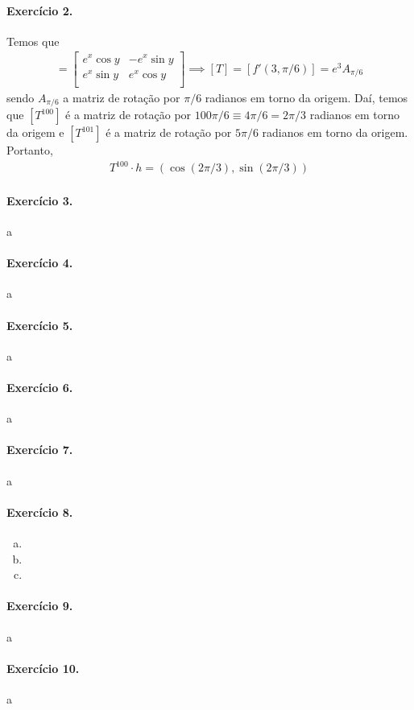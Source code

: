 \documentclass[12pt,a4paper]{article}
\begin{document}
\paragraph{Exercício 2.}
    Temos que
    \begin{align*}
        [f'(x,y)] = 
        \begin{bmatrix}
            e^x\cos y & -e^x\sin y \\
            e^x\sin y & e^x\cos y \\
        \end{bmatrix} 
        \implies
        [T] = [f'(3, \pi/6)] = 
        e^3A_{\pi/6}
    \end{align*}
    sendo $A_{\pi/6}$ a matriz de rotação por $\pi/6$ radianos em torno da origem. Daí, temos que $[T^{100}]$
    é a matriz de rotação por $100\pi/6 \equiv 4\pi/6 = 2\pi/3$ radianos em torno da origem e $[T^{101}]$ é
    a matriz de rotação por $5\pi/6$ radianos em torno da origem. Portanto,
    \begin{align*}
        T^{100}\cdot h = (\cos(2\pi/3), \sin(2\pi/3))
    \end{align*}
%
\paragraph{Exercício 3.}
    a
%
\paragraph{Exercício 4.}
    a
%
\paragraph{Exercício 5.}
    a
%
\paragraph{Exercício 6.}
    a
%
\paragraph{Exercício 7.}
    a
%
\paragraph{Exercício 8.}
%
    \begin{enumerate}[a)]
        \item 
        \item
        \item 
    \end{enumerate}
%
\paragraph{Exercício 9.}
    a
%
\paragraph{Exercício 10.}
    a
%
\end{document}
